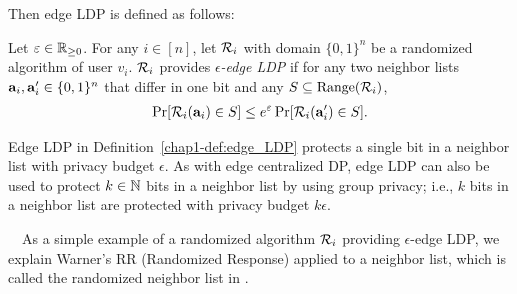 Then edge LDP is defined as follows: 

\begin{definition}  \label{chap1-def:edge_LDP} 
Let $\varepsilon \in \mathbb{R}_{\ge0}$. 
For any $i \in [n]$, let $\mathcal{R}_i$ with domain $\{0,1\}^n$ be a randomized algorithm of user $v_i$. 
$\mathcal{R}_i$ 
provides \emph{$\epsilon$-edge LDP} 
if for any two neighbor lists 
$\mathbf{a}_i, \mathbf{a}'_i \in \{0,1\}^n$ 
that differ in one bit and any 
$S \subseteq \mathrm{Range}(\mathcal{R}_i)$, 
\begin{align}
\Pr[\mathcal{R}_i(\mathbf{a}_i) \in S] \leq e^\varepsilon \Pr[\mathcal{R}_i(\mathbf{a}'_i) \in S].
\label{chap1-eq:edge_LDP}
\end{align}
\end{definition}
Edge LDP in Definition~\ref{chap1-def:edge_LDP} protects 
a single bit in a neighbor list with privacy budget $\epsilon$. 
As with edge centralized DP, edge LDP can also be 
used 
to protect $k \in \mathbb{N}$ 
bits in a neighbor list 
by using group privacy; i.e., $k$ bits in a neighbor list are protected with privacy budget $k\epsilon$. 


\smallskip
~~As a simple example of a randomized algorithm 
$\mathcal{R}_i$ 
providing $\epsilon$-edge LDP, we explain 
Warner's RR (Randomized Response) \cite{Warner_JASA65} applied to a neighbor list, 
which is called 
the randomized neighbor list in \cite{Qin_CCS17}. 

